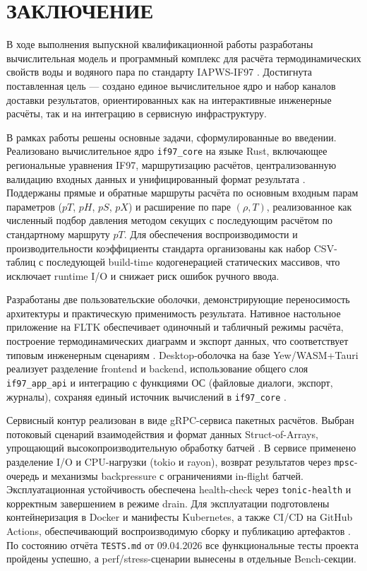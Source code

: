\clearpage
\chapter*{ЗАКЛЮЧЕНИЕ}

В ходе выполнения выпускной квалификационной работы разработаны вычислительная модель и программный комплекс для расчёта термодинамических свойств воды и водяного пара по стандарту IAPWS-IF97 \cite{iapws_if97_2012}.  
Достигнута поставленная цель --- создано единое вычислительное ядро и набор каналов доставки результатов, ориентированных как на интерактивные инженерные расчёты, так и на интеграцию в сервисную инфраструктуру.  

В рамках работы решены основные задачи, сформулированные во введении.  
Реализовано вычислительное ядро \texttt{if97\_core} на языке Rust, включающее региональные уравнения IF97, маршрутизацию расчётов, централизованную валидацию входных данных и унифицированный формат результата \cite{rust_book}.  
Поддержаны прямые и обратные маршруты расчёта по основным входным парам параметров ($pT$, $pH$, $pS$, $pX$) и расширение по паре $(\rho, T)$, реализованное как численный подбор давления методом секущих с последующим расчётом по стандартному маршруту $pT$.  
Для обеспечения воспроизводимости и производительности коэффициенты стандарта организованы как набор CSV-таблиц с последующей build-time кодогенерацией статических массивов, что исключает runtime I/O и снижает риск ошибок ручного ввода.  

Разработаны две пользовательские оболочки, демонстрирующие переносимость архитектуры и практическую применимость результата.  
Нативное настольное приложение на FLTK обеспечивает одиночный и табличный режимы расчёта, построение термодинамических диаграмм и экспорт данных, что соответствует типовым инженерным сценариям \cite{fltk_rs_docs}.  
Desktop-оболочка на базе Yew/WASM+Tauri реализует разделение frontend и backend, использование общего слоя \texttt{if97\_app\_api} и интеграцию с функциями ОС (файловые диалоги, экспорт, журналы), сохраняя единый источник вычислений в \texttt{if97\_core} \cite{tauri_docs}.  

Сервисный контур реализован в виде gRPC-сервиса пакетных расчётов.  
Выбран потоковый сценарий взаимодействия и формат данных Struct-of-Arrays, упрощающий высокопроизводительную обработку батчей \cite{grpc_docs}.  
В сервисе применено разделение I/O и CPU-нагрузки (tokio и rayon), возврат результатов через \texttt{mpsc}-очередь и механизмы backpressure с ограничениями in-flight батчей.  
Эксплуатационная устойчивость обеспечена health-check через \texttt{tonic-health} и корректным завершением в режиме drain.  
Для эксплуатации подготовлены контейнеризация в Docker и манифесты Kubernetes, а также CI/CD на GitHub Actions, обеспечивающий воспроизводимую сборку и публикацию артефактов \cite{docker_docs,kubernetes_docs,github_actions_docs}.  
По состоянию отчёта \texttt{TESTS.md}
от 09.04.2026
все функциональные тесты проекта пройдены успешно,
а perf/stress-сценарии вынесены в отдельные Bench-секции.

